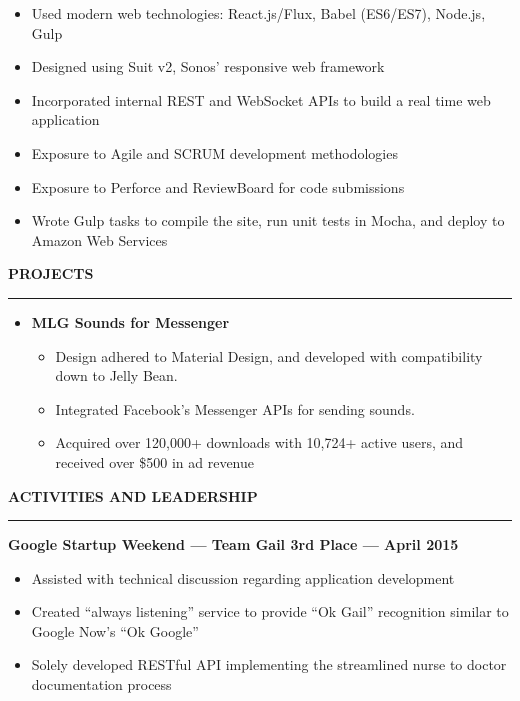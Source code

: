 \documentclass[10pt, oneside]{letter}
\newcommand{\linespaceshit} {
    \vspace{0.05in}
    \hrule
    \vspace{0.05in}
}
\begin{document}
\begin{adjustwidth}{0.1in}{0pt}
\begin{itemize}
\begin{itemize}
                            \item Used modern web technologies: React.js/Flux, Babel (ES6/ES7), Node.js, Gulp
                            \item Designed using Suit v2, Sonos' responsive web framework
                            \item Incorporated internal REST and WebSocket APIs to build a real time web application
                            \item Exposure to Agile and SCRUM development methodologies
                            \item Exposure to Perforce and ReviewBoard for code submissions
                            \item Wrote Gulp tasks to compile the site, run unit tests in Mocha, and deploy to Amazon Web Services
                        \end{itemize}
            \end{itemize}

        \end{adjustwidth}

    \textbf{PROJECTS}
    \linespaceshit
        \begin{adjustwidth}{0.2in}{0pt}
            \begin{itemize}
                \item \textbf{MLG Sounds for Messenger}
                    \begin{itemize}
                        \item Design adhered to Material Design, and developed with compatibility down to Jelly Bean.
                        \item Integrated Facebook's Messenger APIs for sending sounds.
                        \item Acquired over 120,000+ downloads with 10,724+ active users, and received over \$500 in ad revenue
                    \end{itemize}

            \end{itemize}
        \end{adjustwidth}

    \textbf{ACTIVITIES AND LEADERSHIP}
    \linespaceshit
        \textbf{Google Startup Weekend --- Team Gail 3rd Place --- April 2015}
        \begin{adjustwidth}{0.2in}{0pt}
            \begin{itemize}
                \item Assisted with technical discussion regarding application development
                \item Created ``always listening'' service to provide ``Ok Gail'' recognition similar to Google Now's ``Ok Google''
                \item Solely developed RESTful API implementing the streamlined nurse to doctor documentation process
            \end{itemize}
        \end{adjustwidth}
\end{document}
